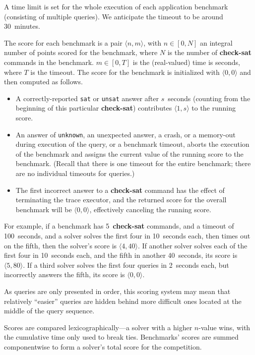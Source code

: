 \documentclass[12pt]{article}
\newcommand{\akey}[1]{\textbf{#1}}
\begin{document}
A time limit is set for the whole execution of each application
benchmark (consisting of multiple queries).  We anticipate the
timeout to be around 30~minutes.

The score for each benchmark is a pair $\langle n,m\rangle$, with
$n\in[0,N]$ an integral number of points scored for the benchmark,
where $N$ is the number of \akey{check-sat} commands
in the benchmark.  $m\in[0,T]$ is the (real-valued) time is seconds, where $T$ is
the timeout.  The score for the benchmark is initialized with
$\langle0,0\rangle$ and then computed as follows.
\begin{itemize}
\item A correctly-reported \texttt{sat} or \texttt{unsat} answer after
  $s$~seconds (counting from the beginning of this particular
  \akey{check-sat}) contributes $\langle1,s\rangle$ to the running
  score.
\item An answer of \texttt{unknown}, an unexpected answer, a crash, or a memory-out during
  execution of the query, or a benchmark timeout, aborts the execution
  of the benchmark and assigns the current value of the running score
  to the benchmark.  (Recall that there is one timeout for the entire
  benchmark; there are no individual timeouts for queries.)
\item The first incorrect answer to a \akey{check-sat} command has the effect of terminating the
  trace executor, and the returned score for the overall benchmark
  will be $\langle0,0\rangle$, effectively canceling the running score.
\end{itemize}

For example, if a benchmark has 5~\akey{check-sat} commands, and a
timeout of 100~seconds, and a solver solves the first four in
10~seconds each, then times out on the fifth, then the solver's score
is $\langle4,40\rangle$.  If another solver solves each of the first
four in 10~seconds each, and the fifth in another 40~seconds, its
score is $\langle5,80\rangle$.  If a third solver solves the first
four queries in 2~seconds each, but incorrectly answers the fifth, its
score is $\langle0,0\rangle$.

As queries are only presented in order, this scoring system may mean
that relatively ``easier'' queries are hidden behind more difficult
ones located at the middle of the query sequence.

Scores are compared lexicographically---a solver with a higher
$n$-value wins, with the cumulative time only used to break ties.
Benchmarks' scores are summed componentwise to form a solver's total
score for the competition.
\end{document}
